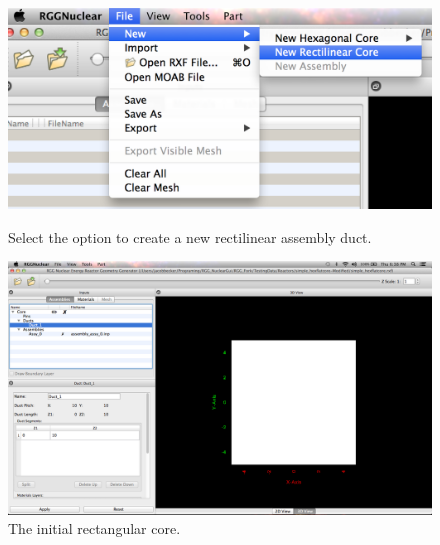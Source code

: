 \begin{figure}
\centering
\begin{minipage}{.45\textwidth}
  \centering
	\includegraphics[width=0.9\linewidth]{Images/rect-1e1.png}
	\caption{Select the option to create a new rectilinear assembly duct.}
	\label{fig:Rect1}
\end{minipage} \hspace{.5cm}%
\begin{minipage}{.45\textwidth}
  \centering
	\includegraphics[width=0.9\linewidth]{Images/rect-init-model.png}
	\caption{The initial rectangular core.}
	\label{fig:NewRect}
\end{minipage}
\end{figure}

